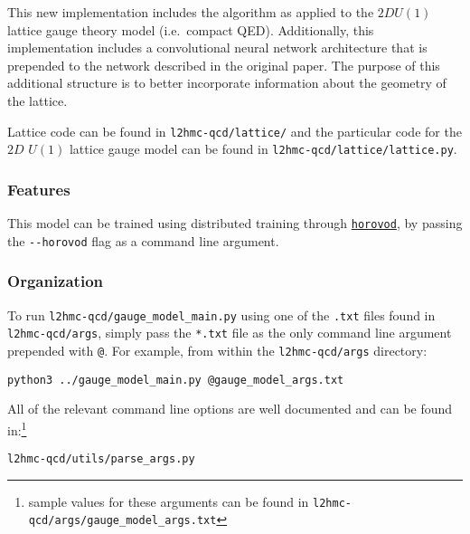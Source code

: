 \vspace{10pt}
\noindent
This new implementation includes the algorithm as applied to the $2D
 U{(1)}$ lattice gauge theory model (i.e.~compact QED).
%
\vspace{10pt}
\noindent
Additionally, this implementation includes a convolutional neural
network architecture that is prepended to the network described in the
original paper. The purpose of this additional structure is to better
incorporate information about the geometry of the lattice.

\vspace{10pt}
\noindent
Lattice code can be found in \texttt{l2hmc-qcd/lattice/} and the
particular code for the $2D$ $U{(1)}$ lattice gauge model can be
found in \texttt{l2hmc-qcd/lattice/lattice.py}.

\hypertarget{features}{%
\subsubsection{Features}\label{features}}
%
This model can be trained using distributed training through
\href{https://github.com/horovod/horovod}{\texttt{horovod}}, by passing
the \texttt{-\/-horovod} flag as a command line argument.

\hypertarget{organization}{%
\subsubsection{Organization}\label{organization}}


To run \texttt{l2hmc-qcd/gauge\_model\_main.py} using one of the
\texttt{.txt} files found in \texttt{l2hmc-qcd/args}, simply pass the
\texttt{*.txt} file as the only command line argument prepended with
\texttt{@}.
%
For example, from within the \texttt{l2hmc-qcd/args} directory:

\texttt{python3 ../gauge\_model\_main.py @gauge\_model\_args.txt}

\vspace{10pt}
\noindent
All of the relevant command line options are well documented and can be
found in:\footnote{sample values for these arguments can be found in
\texttt{l2hmc-qcd/args/gauge\_model\_args.txt}}

\texttt{l2hmc-qcd/utils/parse\_args.py}

